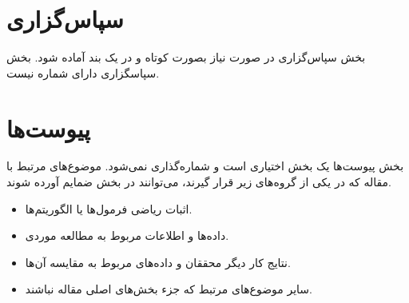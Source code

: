 \documentclass{CCI2020}
\begin{document}
\section*{سپاس‌گزاری}
بخش سپاس‌گزاری در صورت نیاز بصورت کوتاه و در یک بند آماده شود. بخش سپاسگزاری دارای شماره نیست. 

\section*{پیوست‌ها}
بخش پیوست‌ها یک بخش اختیاری است و شماره‌گذاری  نمی‌شود. موضوع‌های مرتبط با مقاله که در یکی از گروه‌های زیر قرار گیرند، می‌توانند در بخش ضمایم آورده شوند.
\begin{itemize}
\item
اثبات ریاضی فرمول‌ها یا الگوریتم‌ها.
\item
داده‌ها و اطلاعات مربوط به مطالعه موردی.
\item
نتایج کار دیگر محققان و داده‌های مربوط به مقایسه آن‌ها.
\item
سایر موضوع‌های مرتبط که جزء بخش‌های اصلی مقاله نباشند.
\end{itemize}

%


\end{document}
